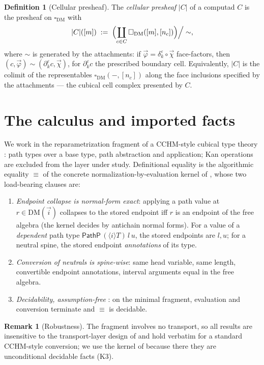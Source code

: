 \documentclass[11pt]{amsart}
\theoremstyle{definition}
\newtheorem{defi}[thm]{Definition}
\newtheorem{rem}[thm]{Remark}
\newcommand{\DM}[1]{\mathrm{DM}(#1)}
\newcommand{\Dbox}{\square_{\mathrm{DM}}}
\newcommand{\aconv}{\equiv}
\newcommand{\PathP}{\mathsf{PathP}}
\newcommand{\Real}[1]{|#1|}
\begin{document}
\begin{defi}[Cellular presheaf]\label{def:cellpresheaf}
  The \emph{cellular presheaf} $\Real{C}$ of a computad $C$ is the
  presheaf on $\Dbox$ with
  \[
    \Real{C}([m]) \;:=\;
    \Bigl(\coprod_{c \in C} \Dbox([m],[n_c])\Bigr)\Big/\sim,
  \]
  where $\sim$ is generated by the attachments: if
  $\vec\varphi = \delta_k^\varepsilon \circ \vec\chi$ face-factors,
  then $(c, \vec\varphi) \sim (\partial_k^\varepsilon c, \vec\chi)$,
  for $\partial_k^\varepsilon c$ the prescribed boundary cell.
  Equivalently, $\Real{C}$ is the colimit of the representables
  $\Dbox(-,[n_c])$ along the face inclusions specified by the
  attachments --- the cubical cell complex presented by $C$.
\end{defi}

\section{The calculus and imported facts}
\label{sec:calc}

We work in the reparametrization fragment of a CCHM-style cubical
type theory \cite{CCHM}: path types over a base type, path
abstraction and application; Kan operations are excluded from the
layer under study.  Definitional equality is the algorithmic
equality $\aconv$ of the concrete normalization-by-evaluation
kernel of \cite{Const}, whose two load-bearing clauses are:

\begin{enumerate}
\item[(K1)] \emph{Endpoint collapse is normal-form exact}: applying
  a path value at $r \in \DM{\vec i}$ collapses to the stored
  endpoint iff $r$ is an endpoint of the free algebra (the kernel
  decides by antichain normal forms).  For a value of a
  \emph{dependent} path type $\PathP\,(\langle i \rangle
  T)\,l\,u$, the stored endpoints are $l, u$; for a neutral spine,
  the stored endpoint \emph{annotations} of its type.
\item[(K2)] \emph{Conversion of neutrals is spine-wise}: same head
  variable, same length, convertible endpoint annotations, interval
  arguments equal in the free algebra.
\item[(K3)] \emph{Decidability, assumption-free} \cite{Const}: on
  the minimal fragment, evaluation and conversion terminate and
  $\aconv$ is decidable.
\end{enumerate}

\begin{rem}[Robustness]\label{rem:robust}
  The fragment involves no transport, so all results are
  insensitive to the transport-layer design of \cite{Const} and
  hold verbatim for a standard CCHM-style conversion; we use the
  kernel of \cite{Const} because there they are unconditional
  decidable facts (K3).
\end{rem}
\end{document}
